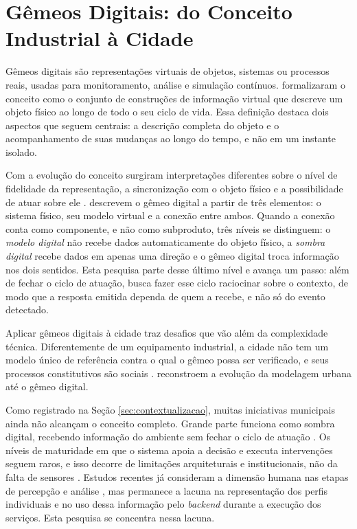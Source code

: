 \section{Gêmeos Digitais: do Conceito Industrial à Cidade}
\label{sec:gemeos-digitais}

Gêmeos digitais são representações virtuais de objetos, sistemas ou processos reais, usadas para monitoramento, análise e simulação contínuos.  formalizaram o conceito como o conjunto de construções de informação virtual que descreve um objeto físico ao longo de todo o seu ciclo de vida. Essa definição destaca dois aspectos que seguem centrais: a descrição completa do objeto e o acompanhamento de suas mudanças ao longo do tempo, e não em um instante isolado.

Com a evolução do conceito surgiram interpretações diferentes sobre o nível de fidelidade da representação, a sincronização com o objeto físico e a possibilidade de atuar sobre ele \cite{fuller2020digital}.  descrevem o gêmeo digital a partir de três elementos: o sistema físico, seu modelo virtual e a conexão entre ambos. Quando a conexão conta como componente, e não como subproduto, três níveis se distinguem: o \textit{modelo digital} não recebe dados automaticamente do objeto físico, a \textit{sombra digital} recebe dados em apenas uma direção e o gêmeo digital troca informação nos dois sentidos. Esta pesquisa parte desse último nível e avança um passo: além de fechar o ciclo de atuação, busca fazer esse ciclo raciocinar sobre o contexto, de modo que a resposta emitida dependa de quem a recebe, e não só do evento detectado.

Aplicar gêmeos digitais à cidade traz desafios que vão além da complexidade técnica. Diferentemente de um equipamento industrial, a cidade não tem um modelo único de referência contra o qual o gêmeo possa ser verificado, e seus processos constitutivos são sociais \cite{batty2018digital}.  reconstroem a evolução da modelagem urbana até o gêmeo digital.

Como registrado na Seção \ref{sec:contextualizacao}, muitas iniciativas municipais ainda não alcançam o conceito completo. Grande parte funciona como sombra digital, recebendo informação do ambiente sem fechar o ciclo de atuação \cite{ferrebigorra2022adoption}. Os níveis de maturidade em que o sistema apoia a decisão e executa intervenções seguem raros, e isso decorre de limitações arquiteturais e institucionais, não da falta de sensores \cite{haraguchi2024assessing}. Estudos recentes já consideram a dimensão humana nas etapas de percepção e análise \cite{luo2025perception,qanazi2025integrating}, mas permanece a lacuna na representação dos perfis individuais e no uso dessa informação pelo \textit{backend} durante a execução dos serviços. Esta pesquisa se concentra nessa lacuna.

